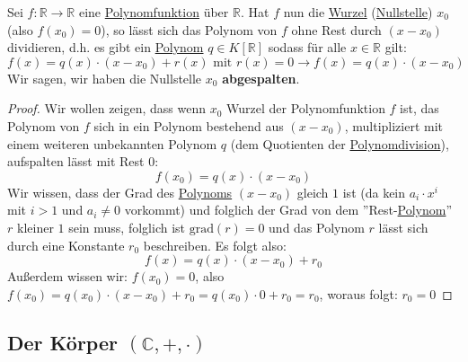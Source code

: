 \documentclass[../../main.tex]{subfiles}
\begin{document}
		\begin{theorem}
			Sei $f:\mathbb{R}\rightarrow \mathbb{R}$ eine \hyperref[def:Polynomfunktion]{Polynomfunktion} über $\mathbb{R}$. Hat $f$ nun die \hyperref[def:Wurzel]{Wurzel} (\hyperref[def:Nullstelle]{Nullstelle}) $x_0$ (also $f(x_0)=0$), so lässt sich das Polynom von $f$ ohne Rest durch $(x-x_0)$ dividieren, d.h. es gibt ein \hyperref[def:Polynom]{Polynom} $q \in K[\mathbb{R}]$ sodass für alle $x\in \mathbb{R}$ gilt: $$f(x)=q(x)\cdot(x-x_0)+r(x) \textrm{ mit } r(x)=0 \rightarrow f(x)=q(x)\cdot(x-x_0)$$
			Wir sagen, wir haben die Nullstelle $x_0$ \textbf{abgespalten}.
			
			\begin{proof}
				Wir wollen zeigen, dass wenn $x_0$ Wurzel der Polynomfunktion $f$ ist, das Polynom von $f$ sich in ein Polynom bestehend aus $(x-x_0)$, multipliziert mit einem weiteren unbekannten Polynom $q$ (dem Quotienten der \hyperref[def:Polynomdivision]{Polynomdivision}), aufspalten lässt mit Rest 0: $$f(x_0)=q(x)\cdot(x-x_0)$$
				Wir wissen, dass der Grad des \hyperref[def:Polynom]{Polynoms} $(x-x_0)$ gleich $1$ ist (da kein $a_i \cdot x^i$ mit $i>1$ und $a_i\not =0$ vorkommt) und folglich der Grad von dem ''Rest-\hyperref[def:Polynom]{Polynom}'' $r$ kleiner $1$ sein muss, folglich ist $\textrm{grad}(r)=0$ und das Polynom $r$ lässt sich durch eine Konstante $r_0$ beschreiben. Es folgt also: $$f(x)=q(x) \cdot (x-x_0) + r_0$$
				Außerdem wissen wir: $f(x_0) = 0$, also $f(x_0)=q(x_0)\cdot(x-x_0)+r_0=q(x_0)\cdot 0 + r_0 = r_0$, woraus folgt: $r_0=0$
			\end{proof}
		\end{theorem}
	
	
		\subsection{Der Körper $(\mathbb{C},+,\cdot)$}
	
\end{document}
